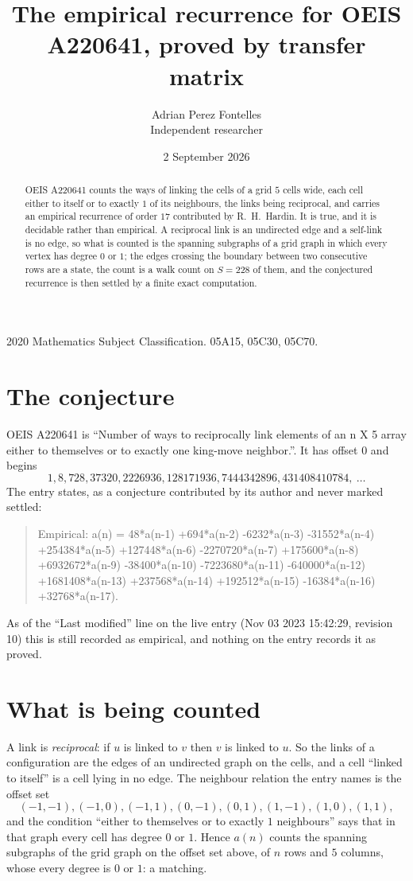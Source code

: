 \documentclass[11pt,a4paper]{article}
\title{The empirical recurrence for OEIS A220641, proved by transfer matrix}
\author{Adrian Perez Fontelles\\ \small Independent researcher}
\date{2 September 2026}
\theoremstyle{plain}
\theoremstyle{definition}
\begin{document}
\maketitle

\begin{abstract}
OEIS A220641 counts the ways of linking the cells of a grid $5$ cells wide, each cell either to
itself or to exactly $1$ of its neighbours, the links being reciprocal, and carries an
empirical recurrence of order $17$ contributed by R.~H.~Hardin. It is true, and it is
decidable rather than empirical. A reciprocal link is an undirected edge and a self-link is
no edge, so what is counted is the spanning subgraphs of a grid graph in which every vertex
has degree $0$ or $1$; the edges crossing the boundary between two consecutive rows are a
state, the count is a walk count on $S=228$ of them, and the conjectured recurrence is then
settled by a finite exact computation.
\end{abstract}

\noindent\small 2020 Mathematics Subject Classification. 05A15, 05C30, 05C70.\normalsize

\section{The conjecture}

OEIS A220641 is ``Number of ways to reciprocally link elements of an n X 5 array either to themselves or to exactly one king-move neighbor.''. It has offset $0$ and begins
\[
1, 8, 728, 37320, 2226936, 128171936, 7444342896, 431408410784,\ \dots
\]
The entry states, as a conjecture contributed by its author and never marked settled:
\begin{quote}
Empirical: a(n) = 48*a(n-1) +694*a(n-2) -6232*a(n-3) -31552*a(n-4) +254384*a(n-5) +127448*a(n-6) -2270720*a(n-7) +175600*a(n-8) +6932672*a(n-9) -38400*a(n-10) -7223680*a(n-11) -640000*a(n-12) +1681408*a(n-13) +237568*a(n-14) +192512*a(n-15) -16384*a(n-16) +32768*a(n-17).
\end{quote}
As of the ``Last modified'' line on the live entry (Nov 03 2023 15:42:29, revision 10) this is still
recorded as empirical, and nothing on the entry records it as proved.

\section{What is being counted}

A link is \emph{reciprocal}: if $u$ is linked to $v$ then $v$ is linked to $u$. So the links
of a configuration are the edges of an undirected graph on the cells, and a cell ``linked to
itself'' is a cell lying in no edge. The neighbour relation the entry names is the offset set
\[
(-1,-1), (-1,0), (-1,1), (0,-1), (0,1), (1,-1), (1,0), (1,1),
\]
and the condition ``either to themselves or to exactly $1$ neighbours'' says that in that
graph every cell has degree $0$ or $1$. Hence $a(n)$ counts the spanning subgraphs of the
grid graph on the offset set above, of $n$ rows and $5$ columns,
whose every degree is $0$ or $1$: a matching.
\end{document}
